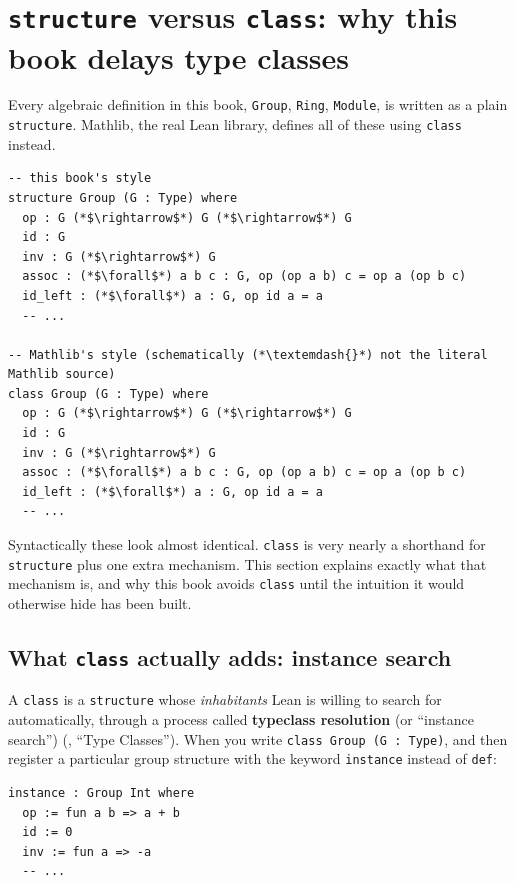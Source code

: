 \section{\texorpdfstring{\texttt{structure} versus \texttt{class}: why this book delays type classes}{structure versus class: why this book delays type classes}}\label{sec:06-rigor-check:01-structure-vs-class:1}

Every algebraic definition in this book, \texttt{Group}, \texttt{Ring}, \texttt{Module}, is written as a plain \texttt{structure}. Mathlib, the real Lean library, defines all of these using \texttt{class} instead.

\begin{lstlisting}
-- this book's style
structure Group (G : Type) where
  op : G (*$\rightarrow$*) G (*$\rightarrow$*) G
  id : G
  inv : G (*$\rightarrow$*) G
  assoc : (*$\forall$*) a b c : G, op (op a b) c = op a (op b c)
  id_left : (*$\forall$*) a : G, op id a = a
  -- ...

-- Mathlib's style (schematically (*\textemdash{}*) not the literal Mathlib source)
class Group (G : Type) where
  op : G (*$\rightarrow$*) G (*$\rightarrow$*) G
  id : G
  inv : G (*$\rightarrow$*) G
  assoc : (*$\forall$*) a b c : G, op (op a b) c = op a (op b c)
  id_left : (*$\forall$*) a : G, op id a = a
  -- ...
\end{lstlisting}

Syntactically these look almost identical. \texttt{class} is very nearly a shorthand for \texttt{structure} plus one extra mechanism. This section explains exactly what that mechanism is, and why this book avoids \texttt{class} until the intuition it would otherwise hide has been built.

\subsection{\texorpdfstring{What \texttt{class} actually adds: instance search}{What class actually adds: instance search}}\label{sec:06-rigor-check:01-structure-vs-class:2}

A \texttt{class} is a \texttt{structure} whose \emph{inhabitants} Lean is willing to search for automatically, through a process called \textbf{typeclass resolution} (or ``instance search'') (\cite{TPIL4}, ``Type Classes''). When you write \texttt{class Group (G : Type)}, and then register a particular group structure with the keyword \texttt{instance} instead of \texttt{def}:

\begin{lstlisting}
instance : Group Int where
  op := fun a b => a + b
  id := 0
  inv := fun a => -a
  -- ...
\end{lstlisting}

